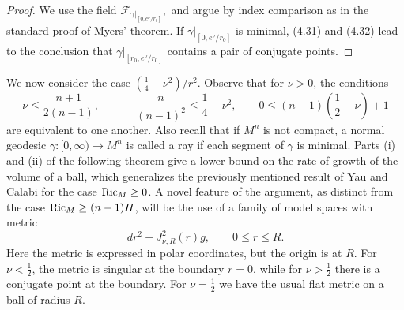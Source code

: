 \begin{proof}
\sketch
We use the field $\mathcal{F}_{\gamma|_{[0,e^{\nu}/r_0]}},$ and argue by index
comparison as in the standard proof of Myers' theorem. If
$\gamma|_{[0,e^{\nu}/r_0]}$ is minimal, (4.31) and (4.32) lead to the conclusion
that $\gamma|_{[r_0,e^{\nu}/r_0]}$ contains a pair of conjugate points.
\end{proof}

We now consider the case $(\frac14-\nu^2)/r^2$. Observe that for $\nu>0$, the
conditions
\begin{equation}
\nu \le \frac{n+1}{2(n-1)}, \qquad
-\frac{n}{(n-1)^2} \le \frac14-\nu^2, \qquad
0 \le (n-1)\left(\frac12-\nu\right)+1
\tag{4.36}
\end{equation}
are equivalent to one another. Also recall that if $M^n$ is not compact, a
normal geodesic $\gamma:[0,\infty)\to M^n$ is called a ray if each segment of
$\gamma$ is minimal. Parts (i) and (ii) of the following theorem give a lower
bound on the rate of growth of the volume of a ball, which generalizes the
previously mentioned result of Yau and Calabi for the case $\operatorname{Ric}_M\ge 0$.
A novel feature of the argument, as distinct from the case
$\operatorname{Ric}_M\ge (n-1)H$, will be the use of a family of model spaces with metric
\[
dr^2 + J^2_{\nu,R}(r)g,\qquad 0\le r\le R.
\]
Here the metric is expressed in polar coordinates, but the origin is at $R$.
For $\nu<\frac12$, the metric is singular at the boundary $r=0$, while for
$\nu>\frac12$ there is a conjugate point at the boundary. For $\nu=\frac12$
we have the usual flat metric on a ball of radius $R$.

